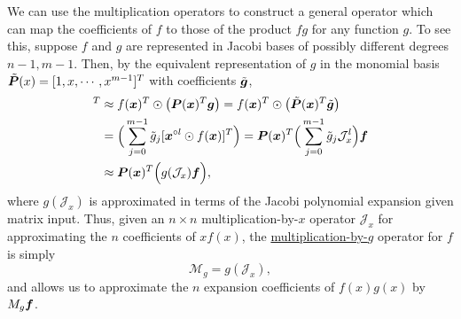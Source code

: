 We can use the multiplication operators to construct a general operator which can map the coefficients of $f$ to those of the product $fg$ for any function $g$. To see this, suppose $f$ and $g$ are represented in Jacobi bases of possibly different degrees $n-1,m-1$. Then, by the equivalent representation of $g$ in the monomial basis $\tilde{\boldsymbol{P}}(x) = [1,x,\cdots,x^{m-1}]^T$ with coefficients $\tilde{\boldsymbol{g}}$,
\begin{align*}
[f(\bs{x})\odot g(\bs{x})]^T &\approx f(\bs{x})^T \odot \big(\bs{P}(\bs{x})^T \bs{g}\big) = f(\bs{x})^T \odot \big(\tilde{\bs{P}}(\bs{x})^T \tilde{\bs{g}}\big) \\&=  \Big(\sum_{j=0}^{m-1} \tilde{g}_j [\bs{x}^{\circ l} \odot f(\bs{x})]^T\Big) = \bs{P}(\bs{x})^T\Big(\sum_{j=0}^{m-1}\tilde{g}_j\mathcal{J}_x^l\Big)\bs{f}\\
&\approx \bs{P}(\bs{x})^T \Big(g(\mathcal{J}_x)\bs{f}\Big),
\end{align*}
where $g(\mathcal{J}_x)$ is approximated in terms of the Jacobi polynomial expansion given matrix input. Thus, given an $n\times n$ multiplication-by-$x$ operator $\mathcal{J}_x$ for approximating the $n$ coefficients of $xf(x)$, the \underline{multiplication-by-$g$} operator for $f$ is simply
\begin{equation}
	\mathcal{M}_g = g(\mathcal{J}_x),
\end{equation}  
and allows us to approximate the $n$ expansion coefficients of $f(x)g(x)$ by $M_g \boldsymbol{f}$.

